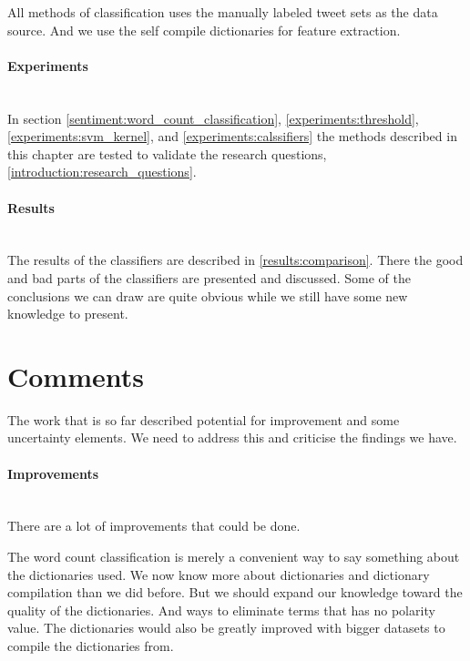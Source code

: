 All methods of classification uses the manually labeled tweet sets as the data
source. And we use the self compile dictionaries for feature extraction. 

\paragraph{Experiments}
\hspace{0pt}\\
In section \ref{sentiment:word_count_classification},
\ref{experiments:threshold}, \ref{experiments:svm_kernel}, and
\ref{experiments:calssifiers} the methods described in this chapter are tested
to validate the research questions, \ref{introduction:research_questions}.

\paragraph{Results}
\hspace{0pt}\\
The results of the classifiers are described in \ref{results:comparison}. There
the good and bad parts of the classifiers are presented and discussed. Some of
the conclusions we can draw are quite obvious while we still have some new
knowledge to present.
%

\section{Comments}\label{sentiment:comments_discussion}
The work that is so far described potential for improvement and some
uncertainty elements. We need to address this and criticise the findings we
have.  

\paragraph{Improvements}
\hspace{0pt}\\
There are a lot of improvements that could be done. 

The word count classification is merely a convenient way to say something about
the dictionaries used. We now know more about dictionaries and dictionary
compilation than we did before. But we should expand our knowledge toward the
quality of the dictionaries. And ways to eliminate terms that has no polarity
value. The dictionaries would also be greatly improved with bigger datasets to
compile the dictionaries from. 

